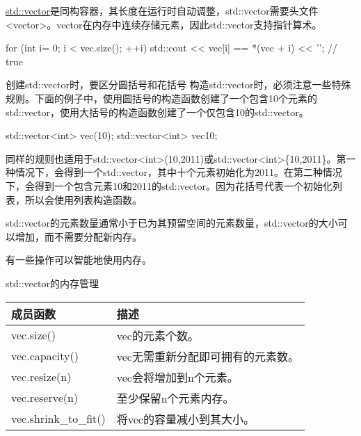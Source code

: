 

\href{http://en.cppreference.com/w/cpp/container/vector}{std::vector}是同构容器，其长度在运行时自动调整，std::vector需要头文件<vector>。vector在内存中连续存储元素，因此std::vector支持指针算术。

\begin{cpp}
for (int i= 0; i < vec.size(); ++i){
	std::cout << vec[i] == *(vec + i) << '\n'; // true
}
\end{cpp}

\begin{myTip}{创建std::vector时，要区分圆括号和花括号}
构造std::vector时，必须注意一些特殊规则。下面的例子中，使用圆括号的构造函数创建了一个包含10个元素的std::vector，使用大括号的构造函数创建了一个仅包含10的std::vector。

\begin{cpp}
std::vector<int> vec(10);
std::vector<int> vec{10};
\end{cpp}

同样的规则也适用于std::vector<int>(10,2011)或std::vector<int>\{10,2011\}。第一种情况下，会得到一个std::vector，其中十个元素初始化为2011。在第二种情况下，会得到一个包含元素10和2011的std::vector。因为花括号代表一个初始化列表，所以会使用列表构造函数。
\end{myTip}


std::vector的元素数量通常小于已为其预留空间的元素数量，std::vector的大小可以增加，而不需要分配新内存。

有一些操作可以智能地使用内存。

\begin{center}
std::vector的内存管理
\end{center}

\begin{longtable}[c]{|l|l|}
\hline
\textbf{成员函数} & \textbf{描述}                                       \\ \hline
\endfirsthead
%
\endhead
%
vec.size()                & vec的元素个数。                                 \\ \hline
vec.capacity()            & vec无需重新分配即可拥有的元素数。 \\ \hline
vec.resize(n)             & vec会将增加到n个元素。                       \\ \hline
vec.reserve(n)            & 至少保留n个元素内存。                    \\ \hline
vec.shrink\_to\_fit()     & 将vec的容量减小到其大小。                       \\ \hline
\end{longtable}


